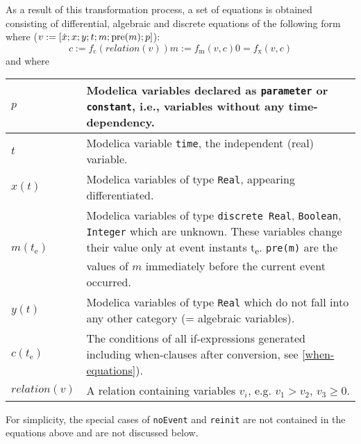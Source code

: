 As a result of this transformation process, a set of equations is
obtained consisting of differential, algebraic and discrete equations of
the following form where ($v := \lbrack \dot{x}; x; y; t; m; \text{\lstinline!pre!}(m); p\rbrack$):
\begin{subequations}
\begin{equation}\label{eq:crossing}
c := f_{\mathrm{c}}(\mathit{relation}(v))
\end{equation}
\begin{equation}
m := f_{\mathrm{m}}(v, c)
\end{equation}
\begin{equation}\label{eq:dae}
0 = f_{\mathrm{x}}(v, c)
\end{equation}
\label{eq:hydrid-dae}
\end{subequations}
and where
\begin{longtable}[]{|p{2cm}|p{12cm}|}
\hline \endhead
$p$ & Modelica variables declared as \lstinline!parameter! or \lstinline!constant!, i.e., variables without any time-dependency.\\
\hline
$t$ & Modelica variable \lstinline!time!, the independent (real) variable.\\
\hline
$x(t)$ & Modelica variables of type \lstinline!Real!, appearing differentiated.\\
\hline
$m(t_{\mathrm{e}})$ & Modelica variables of type \lstinline!discrete Real!, \lstinline!Boolean!, \lstinline!Integer! which are unknown.
These variables change their value only at event instants t\textsubscript{e}. \lstinline!pre(m)! are the values of $m$ immediately before the current event occurred.\\
\hline
$y(t)$ & Modelica variables of type \lstinline!Real! which do not fall into any other category (= algebraic variables).\\
\hline
$c(t_{\mathrm{e}})$ & The conditions of all if-expressions generated including when-clauses after conversion, see \autoref{when-equations}).\\
\hline
$\mathit{relation}(v)$ & A relation containing variables $v_{i}$, e.g. $v_{1} > v_{2}$, $v_{3} \geq 0$.\\
\hline
\end{longtable}

For simplicity, the special cases of \lstinline!noEvent! and \lstinline!reinit! are not contained in the equations
above and are not discussed below.

